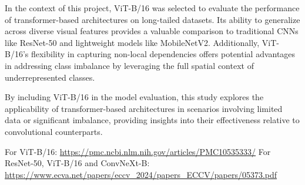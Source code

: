 In the context of this project, ViT-B/16 was selected to evaluate the performance of transformer-based architectures on long-tailed datasets. Its ability to generalize across diverse visual features provides a valuable comparison to traditional CNNs like ResNet-50 and lightweight models like MobileNetV2. Additionally, ViT-B/16’s flexibility in capturing non-local dependencies offers potential advantages in addressing class imbalance by leveraging the full spatial context of underrepresented classes.

By including ViT-B/16 in the model evaluation, this study explores the applicability of transformer-based architectures in scenarios involving limited data or significant imbalance, providing insights into their effectiveness relative to convolutional counterparts.

For ViT-B/16:
\url{https://pmc.ncbi.nlm.nih.gov/articles/PMC10535333/}
For ResNet-50, ViT-B/16 and ConvNeXt-B:
\url{https://www.ecva.net/papers/eccv_2024/papers_ECCV/papers/05373.pdf}



